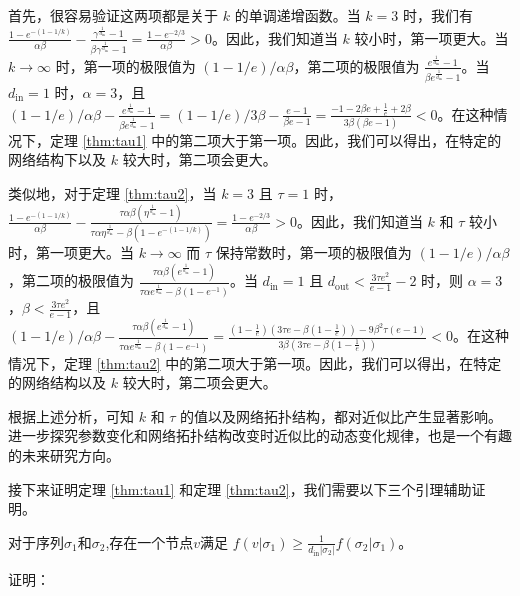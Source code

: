首先，很容易验证这两项都是关于 $k$ 的单调递增函数。当 $k=3$ 时，我们有 $\frac{1-e^{-(1-1/k)}}{\alpha\beta}-\frac{\gamma^{\frac{1}{d_{\text{in}}}}-1}{\beta \gamma^{\frac{1}{d_{\text{in}}}}-1} = \frac{1-e^{-2/3}}{\alpha \beta}>0$。因此，我们知道当 $k$ 较小时，第一项更大。当 $k \to \infty$ 时，第一项的极限值为 $(1-1/e)/\alpha\beta$，第二项的极限值为 $\frac{e^{\frac{1}{d_{\text{in}}}}-1}{\beta e^{\frac{1}{d_{\text{in}}}}-1}$。当 $d_{\text{in}}=1$ 时，$\alpha=3$，且 $(1-1/e)/\alpha\beta-\frac{e^{\frac{1}{d_{\text{in}}}}-1}{\beta e^{\frac{1}{d_{\text{in}}}}-1} =(1-1/e)/3\beta-\frac{e-1}{\beta e-1}=\frac{-1-2\beta e +\frac{1}{e}+2\beta}{3\beta(\beta e-1)}<0$。在这种情况下，定理 \ref{thm:tau1} 中的第二项大于第一项。因此，我们可以得出，在特定的网络结构下以及 $k$ 较大时，第二项会更大。

类似地，对于定理 \ref{thm:tau2}，当 $k=3$ 且 $\tau=1$ 时，$\frac{1-e^{-(1-1/k)}}{\alpha\beta}-\frac{\tau\alpha\beta(\eta^{\frac{1}{d_{\text{in}}}}-1)}{\tau\alpha\eta^{\frac{1}{d_{\text{in}}}}- \beta (1-e^{-(1-1/k)})} = \frac{1-e^{-2/3}}{\alpha \beta}>0$。因此，我们知道当 $k$ 和 $\tau$ 较小时，第一项更大。当 $k \to \infty$ 而 $\tau$ 保持常数时，第一项的极限值为 $(1-1/e)/\alpha\beta$，第二项的极限值为 $\frac{\tau\alpha\beta(e^{\frac{1}{d_{\text{in}}}}-1)}{\tau\alpha e^{\frac{1}{d_{\text{in}}}}- \beta (1-e^{-1}) }$。当 $d_{\text{in}}=1$ 且 $d_{\text{out}}<\frac{3\tau e^2}{e-1}-2$ 时，则 $\alpha=3$，$\beta < \frac{3\tau e^2}{e-1}$，且 $(1-1/e)/\alpha\beta-\frac{\tau\alpha\beta(e^{\frac{1}{d_{\text{in}}}}-1)}{\tau\alpha e^{\frac{1}{d_{\text{in}}}}- \beta (1-e^{-1}) } = \frac{(1-\frac{1}{e})(3\tau e -\beta(1-\frac{1}{e}))-9\beta^2 \tau(e-1)}{3\beta(3\tau e -\beta(1-\frac{1}{e}))}<0$。在这种情况下，定理 \ref{thm:tau2} 中的第二项大于第一项。因此，我们可以得出，在特定的网络结构以及 $k$ 较大时，第二项会更大。

根据上述分析，可知 $k$ 和 $\tau$ 的值以及网络拓扑结构，都对近似比产生显著影响。进一步探究参数变化和网络拓扑结构改变时近似比的动态变化规律，也是一个有趣的未来研究方向。

接下来证明定理 \ref{thm:tau1} 和定理 \ref{thm:tau2}，我们需要以下三个引理辅助证明。

\begin{lemma}
\label{lem:lem1}
对于序列$\sigma_1$和$\sigma_2$,存在一个节点$v$满足 $f(v|\sigma_1) \ge \frac{1}{d_{\text{in}}|\sigma_2|} f(\sigma_2|\sigma_1)$。
\end{lemma}

\noindent 证明：

